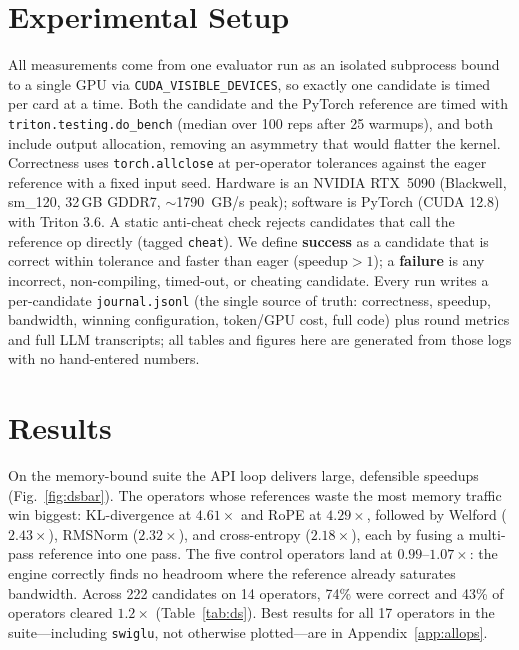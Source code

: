 \documentclass[conference]{IEEEtran}
\begin{document}
\section{Experimental Setup}
All measurements come from one evaluator run as an isolated subprocess bound to a
single GPU via \texttt{CUDA\_VISIBLE\_DEVICES}, so exactly one candidate is timed
per card at a time. Both the candidate and the PyTorch reference are timed with
\texttt{triton.testing.do\_bench} (median over 100 reps after 25 warmups), and
both include output allocation, removing an asymmetry that would flatter the
kernel. Correctness uses \texttt{torch.allclose} at per-operator tolerances
against the eager reference with a fixed input seed. Hardware is an NVIDIA
RTX~5090 (Blackwell, sm\_120, 32\,GB GDDR7, $\sim$1790~GB/s peak); software is
PyTorch (CUDA 12.8) with Triton 3.6. A static anti-cheat check rejects candidates
that call the reference op directly (tagged \texttt{cheat}). We define
\textbf{success} as a candidate that is correct within tolerance and faster than
eager ($\text{speedup}>1$); a \textbf{failure} is any incorrect, non-compiling,
timed-out, or cheating candidate. Every run writes a per-candidate
\texttt{journal.jsonl} (the single source of truth: correctness, speedup,
bandwidth, winning configuration, token/GPU cost, full code) plus round metrics
and full LLM transcripts; all tables and figures here are generated from those
logs with no hand-entered numbers.

\section{Results}
On the memory-bound suite the API loop delivers large, defensible speedups
(Fig.~\ref{fig:dsbar}). The operators whose references waste the most memory
traffic win biggest: KL-divergence at $4.61\times$ and RoPE at $4.29\times$,
followed by Welford ($2.43\times$), RMSNorm ($2.32\times$), and cross-entropy
($2.18\times$), each by fusing a multi-pass reference into one pass. The five
control operators land at $0.99$--$1.07\times$: the engine correctly finds no
headroom where the reference already saturates bandwidth. Across 222 candidates
on 14 operators, 74\% were correct and 43\% of operators cleared $1.2\times$
(Table~\ref{tab:ds}). Best results for all 17 operators in the suite---including
\texttt{swiglu}, not otherwise plotted---are in Appendix~\ref{app:allops}.
\end{document}
